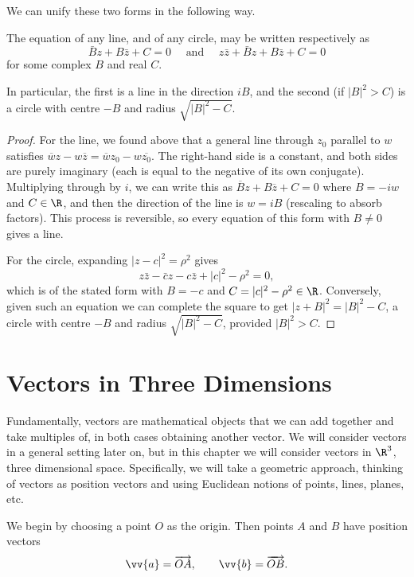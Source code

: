 We can unify these two forms in the following way.

\begin{proposition}
	The equation of any line, and of any circle, may be written respectively as
$$
\bar{B} z+ B \bar{z}+C=0 \quad \text { and } \quad z \bar{z}+\bar{B} z+B \bar{z}+C=0
$$
for some complex $B$ and real $C$.

In particular, the first is a line in the direction $iB$, and the second (if $|B|^2 > C$) is a circle with centre $-B$ and radius $\sqrt{|B|^2 - C}$.
\end{proposition}
\begin{proof}
	For the line, we found above that a general line through $z_0$ parallel to $w$ satisfies $\overline{w}z - w\overline{z} = \overline{w}z_0 - w\overline{z_0}$. The right-hand side is a constant, and both sides are purely imaginary (each is equal to the negative of its own conjugate). Multiplying through by $i$, we can write this as $\overline{B}z + B\overline{z} + C = 0$ where $B = -iw$ and $C \in \R$, and then the direction of the line is $w = iB$ (rescaling to absorb factors). This process is reversible, so every equation of this form with $B \neq 0$ gives a line.

	For the circle, expanding $|z - c|^2 = \rho^2$ gives
	$$
	z\bar{z} - \bar{c}z - c\bar{z} + |c|^2 - \rho^2 = 0,
	$$
	which is of the stated form with $B = -c$ and $C = |c|^2 - \rho^2 \in \R$. Conversely, given such an equation we can complete the square to get $|z + B|^2 = |B|^2 - C$, a circle with centre $-B$ and radius $\sqrt{|B|^2 - C}$, provided $|B|^2 > C$.
\end{proof}


\section{Vectors in Three Dimensions}

Fundamentally, vectors are mathematical objects that we can add together and take multiples of, in both cases obtaining another vector. We will consider vectors in a general setting later on, but in this chapter we will consider vectors in $\R^3$, three dimensional space. Specifically, we will take a geometric approach, thinking of vectors as position vectors and using Euclidean notions of points, lines, planes, etc.

We begin by choosing a point $O$ as the origin. Then points $A$ and $B$ have position vectors
$$
\vv{a} = \overrightarrow{OA}, \quad\quad \vv{b} = \overrightarrow{OB}.
$$

